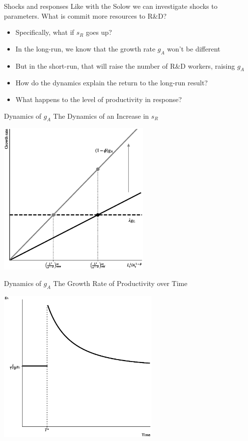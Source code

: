 \begin{frame}{Shocks and responses}
Like with the Solow we can investigate shocks to parameters. What is commit more resources to R\&D? 
\begin{itemize}
	\item Specifically, what if $s_R$ goes up?
	\item In the long-run, we know that the growth rate $g_A$ won't be different
	\item But in the short-run, that will raise the number of R\&D workers, raising $g_A$
	\item How do the dynamics explain the return to the long-run result?
	\item What happens to the level of productivity in response?
\end{itemize}
\end{frame}

\begin{frame}{Dynamics of $g_A$}
The Dynamics of an Increase in $s_R$
\begin{center}
\includegraphics[height = 3in]{../Figures/fig-ch5-fig2.eps}
\end{center}
\end{frame}

\begin{frame}{Dynamics of $g_A$}
The Growth Rate of Productivity over Time
\begin{center}
\includegraphics[height = 3in]{../Figures/fig-ch5-fig3.eps}
\end{center}
\end{frame}

